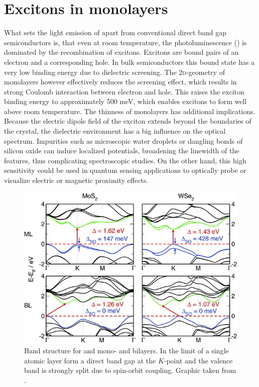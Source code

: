 \section{Excitons in \tmdg monolayers}\label{theory_exciton}

What sets the light emission of \tmds apart from conventional direct band gap semiconductors is, that even at room temperature, the photoluminescence (\pl\!) is dominated by the recombination of excitons. Excitons are bound pairs of an electron and a corresponding hole. In bulk semiconductors this bound state has a very low binding energy due to dielectric screening. The 2\textsc{d}-geometry of \tmdg monolayers however effectively reduces the screening effect, which results in strong Coulomb interaction between electron and hole. This raises the exciton binding energy to approximately 500 meV, which enables excitons to form well above room temperature\cite{chernikov_exciton_2014}.
The thinness of \tmdg monolayers has additional implications. Because the electric dipole field of the exciton extends beyond the boundaries of the crystal, the dielectric environment has a big influence on the optical spectrum\cite{stier_probing_2016, borghardt_engineering_2017, jakubczyk_impact_2018}. Impurities such as microscopic water droplets or dangling bonds of silicon oxide can induce localized potentials, broadening the linewidth of the \pl features, thus complicating spectroscopic studies. On the other hand, this high sensitivity could be used in quantum sensing applications to optically probe or visualize electric or magnetic proximity effects\cite{neumann_opto-valleytronic_2017}.


\begin{figure}[t]
\centering
\includegraphics[width=.7\textwidth]{bandstructure}
\caption{Band structure for \mos and \wse mono- and bilayers. In the limit of a single atomic layer \tmds form a direct band gap at the $K$-point and the valence band is strongly split due to spin-orbit coupling. Graphic taken from \cite{zibouche_transition-metal_2014_2}.}
\label{bandgap}

\end{figure}

